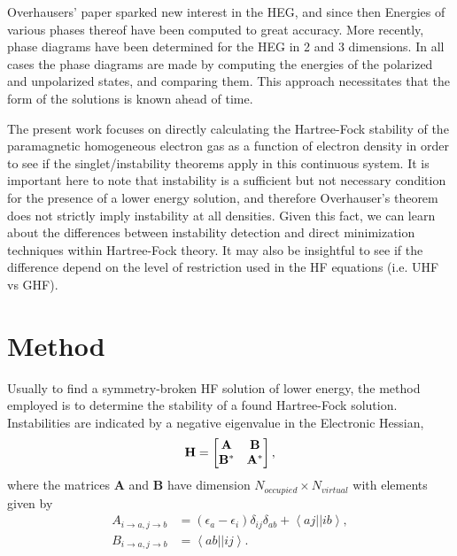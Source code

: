 \documentclass[preprint, journal=prl]{revtex4-1}
\begin{document}
  Overhausers' paper sparked new interest in the HEG, and since then Energies of various phases thereof have been computed to great accuracy\cite{Ceperley1980}. More recently, phase diagrams have been determined for the HEG in 2 and 3 dimensions\cite{Delyon2008, Bernu2011, Baguet2013}. In all cases the phase diagrams are made by computing the energies of the polarized and unpolarized states, and comparing them. This approach necessitates that the form of the solutions is known ahead of time. 
  
  The present work focuses on directly calculating the Hartree-Fock stability of the paramagnetic homogeneous electron gas as a function of electron density in order to see if the singlet/instability theorems apply in this continuous system.  It is important here to note that instability is a sufficient but not necessary condition for the presence of a lower energy solution, and therefore Overhauser's theorem does not strictly imply instability at all densities. Given this fact, we can learn about the differences between instability detection and direct minimization techniques within Hartree-Fock theory. It may also be insightful to see if the difference depend on the level of restriction used in the HF equations (i.e. UHF vs GHF).  
        
\section{Method}

  Usually to find a symmetry-broken HF solution of lower energy, the method employed is to determine the stability of a found Hartree-Fock solution. Instabilities are indicated by a negative eigenvalue in the Electronic Hessian, 
  \begin{equation}
    \bf{H}=
    \begin{bmatrix}
      \bf{A} &\bf{B} \\
      \bf{B}^* & \bf{A}^* \\
    \end{bmatrix},
  \end{equation} 
  where the matrices $\mathbf{A}$ and $\mathbf{B}$ have dimension $N_{occupied} \times N_{virtual}$ with elements given by
  \begin{align}
     A_{i \rightarrow a, j \rightarrow b} &= (\epsilon_a-\epsilon_i)\delta_{ij}\delta_{ab} 
     + \left< aj||ib \right>, \\
     B_{i \rightarrow a, j \rightarrow b} &= \left< ab||ij \right>. 
  \end{align}    
  
\end{document}
